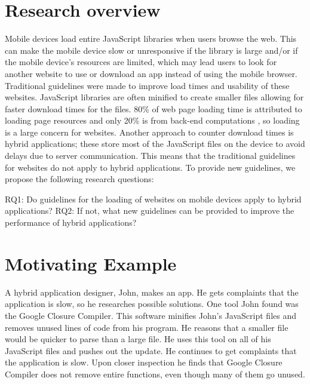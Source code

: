 \documentclass{acm_proc_article-sp}
\begin{document}
\maketitle




\section{Research overview}
Mobile devices load entire JavaScript libraries when users browse the web. This can make the mobile device slow or unresponsive if the library is large and/or if the mobile device’s resources are limited, which may lead users to look for another website to use or download an app instead of using the mobile browser. Traditional guidelines were made to improve load times and usability of these websites. JavaScript libraries are often minified to create smaller files allowing for faster download times for the files. 80\% of web page loading time is attributed to loading page resources and only 20\% is from back-end computations \cite{souders2008high}, so loading is a large concern for websites. Another approach to counter download times is hybrid applications; these store most of the JavaScript files on the device to avoid delays due to server communication. This means that the traditional guidelines for websites do not apply to hybrid applications.  To provide new guidelines, we propose the following research questions:

RQ1: Do guidelines for the loading of websites on mobile devices apply to hybrid applications?
RQ2: If not, what new guidelines can be provided to improve the performance of hybrid applications?

\section{Motivating Example}
A hybrid application designer, John, makes an app.  He gets complaints that the application is slow, so he researches possible solutions.  One tool John found was the Google Closure Compiler.  This software minifies John's JavaScript files and removes unused lines of code from his program.  He reasons that a smaller file would be quicker to parse than a large file.  He uses this tool on all of his JavaScript files and pushes out the update.  He continues to get complaints that the application is slow.  Upon closer inspection he finds that Google Closure Compiler does not remove entire functions, even though many of them go unused.  
\end{document}
